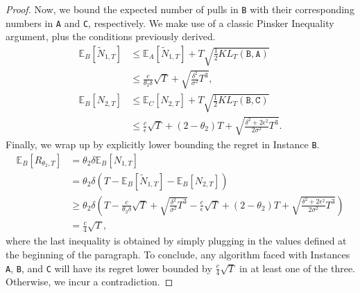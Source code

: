 \begin{proof}
    Now, we bound the expected number of pulls in \texttt{B} with their corresponding numbers in \texttt{A} and \texttt{C}, respectively. We make use of a classic Pinsker Inequality argument, plus the conditions previously derived.
    \begin{align*}
        \mathbb{E}_B[\widetilde{N}_{1,T}] &\le \mathbb{E}_A[\widetilde{N}_{1,T}] +T\sqrt{\frac{1}{2}KL_T(\texttt{B},\texttt{A})} \\
        &\le \frac{c}{\theta_2 \delta}\sqrt{T}+\sqrt{\frac{\delta^2}{\sigma^2}T^3},\\
        \mathbb{E}_B[{N}_{2,T}] &\le \mathbb{E}_C[{N}_{2,T}] +T\sqrt{\frac{1}{2}KL_T(\texttt{B},\texttt{C})} \\
        &\le \frac{c}{\epsilon}\sqrt{T}+(2-\theta_2)T+\sqrt{\frac{\delta^2+2\epsilon^2}{2\sigma^2}T^3}.
    \end{align*}
    Finally, we wrap up by explicitly lower bounding the regret in Instance \texttt{B}.
    \begin{align*}
        \mathbb{E}_B[R_{\theta_2,T}] &= \theta_2\delta\mathbb{E}_B[{N}_{1,T}] \\
        &=\theta_2\delta(T-\mathbb{E}_B[\widetilde{N}_{1,T}]-\mathbb{E}_B[{N}_{2,T}]) \\
        &\ge \theta_2 \delta \left(T-\frac{c}{\theta_2 \delta}\sqrt{T}+\sqrt{\frac{\delta^2}{\sigma^2}T^3}-\frac{c}{\epsilon}\sqrt{T}+(2-\theta_2)T+\sqrt{\frac{\delta^2+2\epsilon^2}{2\sigma^2}T^3}\right) \\
        &=\frac{c}{4}\sqrt{T},
    \end{align*}
    where the last inequality is obtained by simply plugging in the values defined at the beginning of the paragraph. To conclude, any algorithm \alg faced with Instances \texttt{A}, \texttt{B}, and \texttt{C} will have its regret lower bounded by $\frac{c}{4}\sqrt{T}$ in at least one of the three. Otherwise, we incur a contradiction.



\end{proof}
